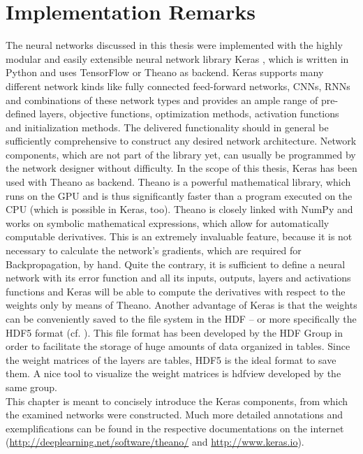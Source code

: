 \documentclass[11pt, a4paper]{article}
\begin{document}
\begin{appendix}
\label{appendix}

\section{Implementation Remarks}
The neural networks discussed in this thesis were implemented with the highly modular and easily extensible neural network library Keras \cite{keras}, which is written in Python and uses TensorFlow or Theano \cite{theano} as backend. Keras supports many different network kinds like fully connected feed-forward networks, \acp{CNN}, \acp{RNN} and combinations of these network types and provides an ample range of pre-defined layers, objective functions, optimization methods, activation functions and initialization methods. The delivered functionality should in general be sufficiently comprehensive to construct any desired network architecture. Network components, which are not part of the library yet, can usually be programmed by the network designer without difficulty. In the scope of this thesis, Keras has been used with Theano as backend. Theano is a powerful mathematical library, which runs on the \ac{GPU} and is thus significantly faster than a program executed on the \ac{CPU} (which is possible in Keras, too). Theano is closely linked with NumPy and works on symbolic mathematical expressions, which allow for automatically computable derivatives. This is an extremely invaluable feature, because it is not necessary to calculate the network's gradients, which are required for Backpropagation, by hand. Quite the contrary, it is sufficient to define a neural network with its error function and all its inputs, outputs, layers and activations functions and Keras will be able to compute the derivatives with respect to the weights only by means of Theano. Another advantage of Keras is that the weights can be conveniently saved to the file system in the \ac{HDF} -- or more specifically the HDF5 format (cf. \cite{hdf5}). This file format has been developed by the HDF Group in order to facilitate the storage of huge amounts of data organized in tables. Since the weight matrices of the layers are tables, \ac{HDF}5 is the ideal format to save them. A nice tool to visualize the weight matrices is hdfview developed by the same group.\\
This chapter is meant to concisely introduce the Keras components, from which the examined networks were constructed. Much more detailed annotations and exemplifications can be found in the respective documentations on the internet (\url{http://deeplearning.net/software/theano/} and \url{http://www.keras.io}).


\end{appendix}
\end{document}

